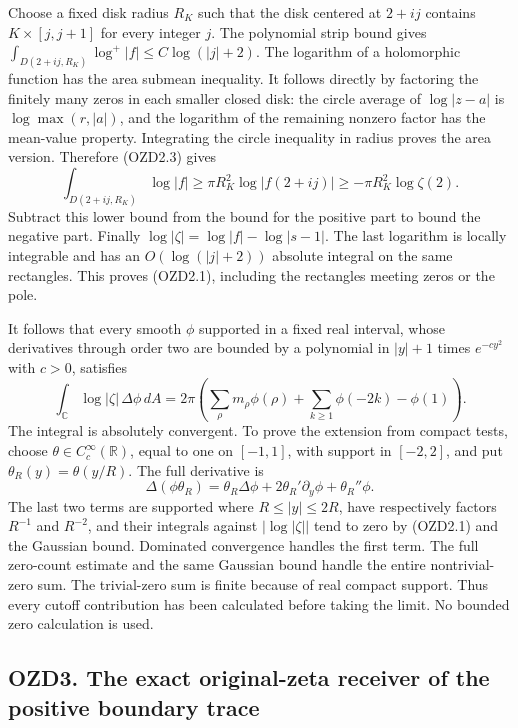 Choose a fixed disk radius \(R_K\) such that the disk centered at
\(2+ij\) contains \(K\times[j,j+1]\) for every integer \(j\). The
polynomial strip bound gives
\(\int_{D(2+ij,R_K)}\log^+|f|\le C\log(|j|+2)\). The logarithm of a
holomorphic function has the area submean inequality. It follows
directly by factoring the finitely many zeros in each smaller closed
disk: the circle average of \(\log|z-a|\) is \(\log\max(r,|a|)\), and
the logarithm of the remaining nonzero factor has the mean-value
property. Integrating the circle inequality in radius proves the area
version. Therefore (OZD2.3) gives \[
\int_{D(2+ij,R_K)}\log|f|\ge
\pi R_K^2\log|f(2+ij)|\ge-\pi R_K^2\log\zeta(2).
\] Subtract this lower bound from the bound for the positive part to
bound the negative part. Finally \(\log|\zeta|=\log|f|-\log|s-1|\). The
last logarithm is locally integrable and has an \(O(\log(|j|+2))\)
absolute integral on the same rectangles. This proves (OZD2.1),
including the rectangles meeting zeros or the pole.

It follows that every smooth \(\phi\) supported in a fixed real
interval, whose derivatives through order two are bounded by a
polynomial in \(|y|+1\) times \(e^{-c y^2}\) with \(c>0\), satisfies \[
\int_{\mathbb C}\log|\zeta|\,\Delta\phi\,dA
=2\pi\left(\sum_\rho m_\rho\phi(\rho)
+\sum_{k\ge1}\phi(-2k)-\phi(1)\right).
\tag{OZD2.4}
\] The integral is absolutely convergent. To prove the extension from
compact tests, choose \(\theta\in C_c^\infty(\mathbb R)\), equal to one
on \([-1,1]\), with support in \([-2,2]\), and put
\(\theta_R(y)=\theta(y/R)\). The full derivative is \[
\Delta(\phi\theta_R)=\theta_R\Delta\phi
+2\theta_R'\partial_y\phi+\theta_R''\phi.
\tag{OZD2.5}
\] The last two terms are supported where \(R\le|y|\le2R\), have
respectively factors \(R^{-1}\) and \(R^{-2}\), and their integrals
against \(|\log|\zeta||\) tend to zero by (OZD2.1) and the Gaussian
bound. Dominated convergence handles the first term. The full zero-count
estimate and the same Gaussian bound handle the entire nontrivial-zero
sum. The trivial-zero sum is finite because of real compact support.
Thus every cutoff contribution has been calculated before taking the
limit. No bounded zero calculation is used.

\subsection{OZD3. The exact original-zeta receiver of the positive
boundary
trace}\label{ozd3.-the-exact-original-zeta-receiver-of-the-positive-boundary-trace}


